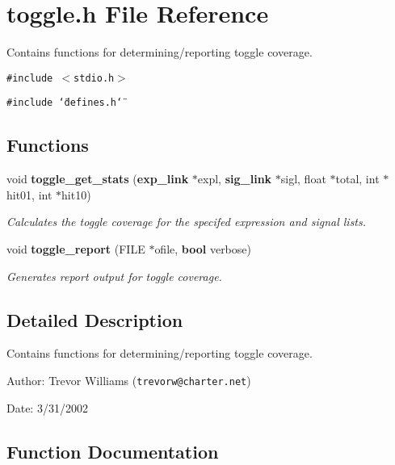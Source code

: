 \section{toggle.h File Reference}
\label{toggle_8h}
Contains functions for determining/reporting toggle coverage. 


{\tt \#include $<$stdio.h$>$}\par
{\tt \#include \char`\"{}defines.h\char`\"{}}\par
\subsection*{Functions}
\begin{CompactItemize}
\item 
void {\bf toggle\_\-get\_\-stats} ({\bf exp\_\-link} $\ast$expl, {\bf sig\_\-link} $\ast$sigl, float $\ast$total, int $\ast$hit01, int $\ast$hit10)
\begin{CompactList}\small\item\em Calculates the toggle coverage for the specifed expression and signal lists.\item\end{CompactList}\item 
void {\bf toggle\_\-report} (FILE $\ast$ofile, {\bf bool} verbose)
\begin{CompactList}\small\item\em Generates report output for toggle coverage.\item\end{CompactList}\end{CompactItemize}


\subsection{Detailed Description}
Contains functions for determining/reporting toggle coverage.

\begin{Desc}
\item[Author:]Trevor Williams ({\tt trevorw@charter.net}) \end{Desc}
\begin{Desc}
\item[Date:]3/31/2002 \end{Desc}


\subsection{Function Documentation}
